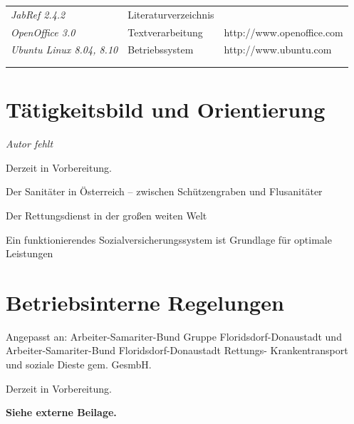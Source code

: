 \documentclass{article}
\newcommand\gEs[1]{\textbf{\textcolor[rgb]{0.0,0.0,0.5019608}{#1}}}
\newcommand\gEs[1]{\textbf{\textcolor[rgb]{0.0,0.0,0.5019608}{#1}}}
\begin{document}
\begin{center}
\tablehead{}\begin{supertabular}{m{5.0740004cm}m{5.0740004cm}m{5.0740004cm}}
{\mdseries\itshape JabRef 2.4.2 }

 &
\centering Literaturverzeichnis\par

 &
\\
{\mdseries\itshape OpenOffice 3.0}

 &
\centering Textverarbeitung\par

 &
\raggedleft http://www.openoffice.com\par

\\
{\mdseries\itshape Ubuntu Linux 8.04, 8.10}

 &
\centering Betriebssystem\par

 &
\raggedleft http://www.ubuntu.com\par

\\
 &
 &
\\
 &
 &
\\
\end{supertabular}
\end{center}
\section{T\"atigkeitsbild und Orientierung}
{\mdseries\itshape
Autor fehlt}

{\mdseries
Derzeit in Vorbereitung.}

{\mdseries
Der Sanit\"ater in \"Osterreich -- zwischen Sch\"utzengraben und
Flusanit\"ater}

{\mdseries
Der Rettungsdienst in der gro{\ss}en weiten Welt }

{\mdseries
Ein funktionierendes Sozialversicherungssystem ist Grundlage f\"ur
optimale Leistungen}

\section{Betriebsinterne Regelungen}
{\mdseries
Angepasst an: Arbeiter-Samariter-Bund Gruppe Floridsdorf-Donaustadt und 
Arbeiter-Samariter-Bund Floridsdorf-Donaustadt Rettungs-
Krankentransport und soziale Dieste gem. GesmbH.}

{\mdseries
Derzeit in Vorbereitung.}

{\mdseries
\gEs{Siehe externe Beilage. }}
\end{document}
